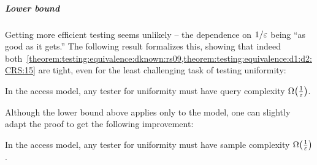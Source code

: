 \subparagraph{Lower bound} Getting more efficient testing seems unlikely -- the dependence on $1/\varepsilon$ being ``as good as it gets.'' The following result formalizes this, showing that indeed both~\cref{theorem:testing:equivalence:dknown:rs09,theorem:testing:equivalence:d1:d2:CRS:15} are tight, even for the least challenging task of testing uniformity:
\begin{theorem}\label{theorem:testing:uniformity:lb}
In the \pdfsamp access model, any tester for uniformity must have query complexity $\bigOmega{\frac{1}{\eps}}$.
\end{theorem}
Although the lower bound above applies only to the \pdfsamp model, one can slightly adapt the proof to get the following improvement:
\begin{theorem}\label{theorem:testing:uniformity:lb:cdfquery}
In the \cdfsamp access model, any tester for uniformity must have sample complexity $\bigOmega{\frac{1}{\eps}}$.
\end{theorem}
